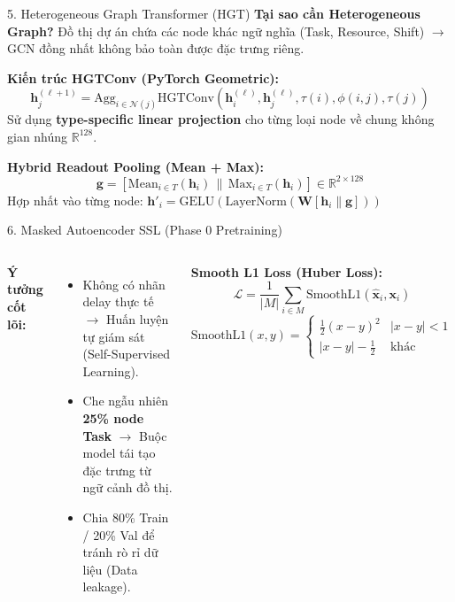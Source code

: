 \begin{frame}{5. Heterogeneous Graph Transformer (HGT)}
    \textbf{Tại sao cần Heterogeneous Graph?}
    Đồ thị dự án chứa các node khác ngữ nghĩa (Task, Resource, Shift) $\rightarrow$ GCN đồng nhất không bảo toàn được đặc trưng riêng.
    
    \vspace{0.2cm}
    \textbf{Kiến trúc HGTConv (PyTorch Geometric):}
    \begin{equation}
        \mathbf{h}^{(\ell+1)}_j = \text{Agg}_{i \in \mathcal{N}(j)} \text{HGTConv}(\mathbf{h}^{(\ell)}_i, \mathbf{h}^{(\ell)}_j, \tau(i), \phi(i,j), \tau(j))
    \end{equation}
    Sử dụng \textbf{type-specific linear projection} cho từng loại node về chung không gian nhúng $\mathbb{R}^{128}$.

    \vspace{0.2cm}
    \textbf{Hybrid Readout Pooling (Mean + Max):}
    \begin{equation}
        \mathbf{g} = [\text{Mean}_{i \in T}(\mathbf{h}_i) \,\|\, \text{Max}_{i \in T}(\mathbf{h}_i)] \in \mathbb{R}^{2 \times 128}
    \end{equation}
    Hợp nhất vào từng node: $\mathbf{h}'_i = \text{GELU}(\text{LayerNorm}(\mathbf{W}[\mathbf{h}_i \| \mathbf{g}]))$
\end{frame}

\begin{frame}{6. Masked Autoencoder SSL (Phase 0 Pretraining)}
    \begin{columns}
        \textbf{Ý tưởng cốt lõi:}
        \begin{itemize}
            \item Không có nhãn delay thực tế $\rightarrow$ Huấn luyện tự giám sát (Self-Supervised Learning).
            \item Che ngẫu nhiên \textbf{25\% node Task} $\rightarrow$ Buộc model tái tạo đặc trưng từ ngữ cảnh đồ thị.
            \item Chia 80\% Train / 20\% Val để tránh rò rỉ dữ liệu (Data leakage).
        \end{itemize}
        
        \textbf{Smooth L1 Loss (Huber Loss):}
        \begin{equation}
            \mathcal{L} = \frac{1}{|M|} \sum_{i \in M} \text{SmoothL1}(\hat{\mathbf{x}}_i, \mathbf{x}_i)
        \end{equation}
        $\text{SmoothL1}(x, y) = \begin{cases} \frac{1}{2}(x-y)^2 & |x-y| < 1 \\ |x-y| - \frac{1}{2} & \text{khác} \end{cases}$
    \end{columns}
\end{frame}


